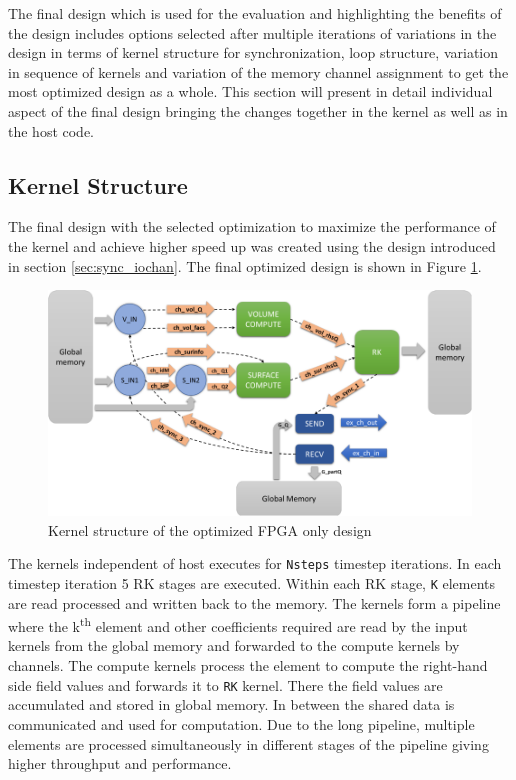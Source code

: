The final design which is used for the evaluation and highlighting the benefits of the design includes
options selected after multiple iterations of variations in the design in terms of kernel
structure for synchronization, loop structure, variation in sequence of kernels and variation
of the memory channel assignment to get the most optimized design as a whole. This section
will present in detail individual aspect of the final design bringing the changes together
in the kernel as well as in the host code.

\subsection{Kernel Structure}

The final design with the selected optimization to maximize the performance of the kernel and achieve
higher speed up was created using the design introduced in section \ref{sec:sync_iochan}.
The final optimized design is shown in Figure \ref{fig:fpgaonly_kernstruc}.

\begin{figure}[ht]%
    \centering
    \includegraphics[width=1.0\textwidth]{images/fpgaonly_kernstruc}
    \caption{Kernel structure of the optimized FPGA only design}
    \label{fig:fpgaonly_kernstruc}
\end{figure}

The kernels independent of host executes for \texttt{Nsteps} timestep iterations.
In each timestep iteration 5 RK stages are executed. Within each RK stage, \texttt{K}
elements are read processed and written back to the memory. The kernels form a pipeline
where the k\textsuperscript{th} element and other coefficients required are read by the
input kernels from the global memory and forwarded to the compute kernels by channels.
The compute kernels process the element to compute the right-hand side field values and
forwards it to \texttt{RK} kernel. There the field values are accumulated and stored in global memory.
In between the shared data is communicated and used for computation. Due to the long pipeline,
multiple elements are processed simultaneously in different stages of the pipeline giving
higher throughput and performance.

